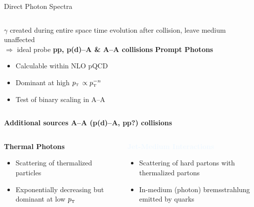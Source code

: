 \documentclass[aspectratio=169,10pt]{beamer}
\newcommand{\pT}          {\ensuremath{p_{\mbox{\tiny T}}}}
\begin{document}
\begin{frame}{Direct Photon Spectra}
\begin{columns}
\begin{columns}
\begin{column}{4.8cm}
            $\gamma$ created during entire space time evolution after collision, leave medium unaffected \\ 
            $\Rightarrow$ ideal probe
            \center
            \textbf{pp, p(d)--A \& A--A collisions}
            \textcolor{AliceGreen}{\hspace{1cm}\textbf{Prompt Photons}} %
            \begin{itemize}
              \small
              \item Calculable within NLO pQCD
              \item Dominant at high $\pT$ $\propto \pT^{-n}$
              \item Test of binary scaling in A--A
            \end{itemize}
          \end{column}
      \end{columns}  
    \end{columns}
    \vspace{-0.2cm}
    \center
    \textbf{Additional sources A--A (p(d)--A, pp?) collisions}
    \vspace{0.2cm}
    \begin{columns}
      \vspace{0.1cm}
      \begin{column}{8cm}
        \centering
        \textcolor{AliceRed}{\textbf{Thermal Photons}}\\ \vspace{-0.2cm}
        \begin{itemize}
          \small
          \item Scattering of thermalized particles
          \item Exponentially decreasing but dominant at low $p_{\mbox{\tiny T}}$ 
        \end{itemize}
        \vspace{0.25cm}
      \end{column}
      \hspace{-0.5cm}
      \vspace{-0.1cm}
      \begin{column}{9cm}
        \centering
        \textcolor{AliceBlue}{\textbf{Jet-Medium Interactions}}\\ \vspace{-0.2cm}
        \begin{itemize}
          \small
          \item Scattering of hard partons with thermalized partons
          \item In-medium (photon) bremsstrahlung emitted by quarks
        \end{itemize}
        \vspace{0.05cm}
          \end{column}
      \end{columns}
    \end{frame}
\end{document}

